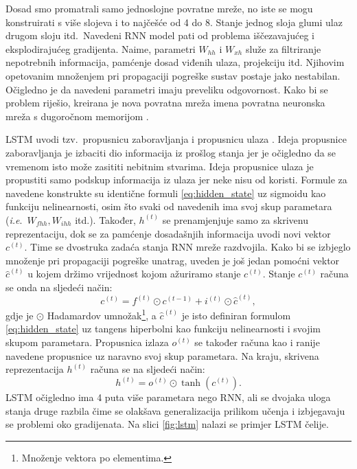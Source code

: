 \documentclass[times, utf8, diplomski]{fer}
\begin{document}
Dosad smo promatrali samo jednoslojne povratne mreže, no iste se mogu konstruirati s više slojeva i to najčešće od 4 do 8. Stanje jednog sloja glumi ulaz drugom sloju itd.\ Navedeni RNN model pati od problema iščezavajućeg i eksplodirajućeg gradijenta. Naime, parametri $W_{hh}$ i $W_{xh}$ služe za filtriranje nepotrebnih informacija, pamćenje dosad viđenih ulaza, projekciju itd. Njihovim opetovanim množenjem pri propagaciji pogreške sustav postaje jako nestabilan. Očigledno je da navedeni parametri imaju preveliku odgovornost. Kako bi se problem riješio, kreirana je nova povratna mreža imena povratna neuronska mreža s dugoročnom memorijom .

LSTM uvodi tzv.\ propusnicu zaboravljanja  i propusnicu ulaza . Ideja propusnice zaboravljanja je izbaciti dio informacija iz prošlog stanja jer je očigledno da se vremenom isto može zasititi nebitnim stvarima. Ideja propusnice ulaza je propustiti samo podskup informacija iz ulaza jer neke nisu od koristi. Formule za navedene konstrukte su identične formuli \ref{eq:hidden_state} uz sigmoidu kao funkciju nelinearnosti, osim što svaki od navedenih ima svoj skup parametara (\textit{i.e}.\ $W_{fhh}, W_{ihh}$ itd.). Također, $h^{(t)}$ se prenamjenjuje samo za skrivenu reprezentaciju, dok se za pamćenje dosadašnjih informacija uvodi novi vektor $c^{(t)}$. Time se dvostruka zadaća stanja RNN mreže razdvojila. Kako bi se izbjeglo množenje pri propagaciji pogreške unatrag, uveden je još jedan pomoćni vektor $\hat{c}^{(t)}$ u kojem držimo vrijednost kojom ažuriramo stanje $c^{(t)}$. Stanje $c^{(t)}$ računa se onda na sljedeći način:
\begin{equation}
    c^{(t)} = f^{(t)} \odot c^{(t-1)} + i^{(t)} \odot \hat{c}^{(t)},
\end{equation}
gdje je $\odot$ Hadamardov umnožak\footnote{Množenje vektora po elementima.}, a $\hat{c}^{(t)}$ je isto definiran formulom \ref{eq:hidden_state} uz tangens hiperbolni kao funkciju nelinearnosti i svojim skupom parametara. Propusnica izlaza  $o^{(t)}$ se također računa kao i ranije navedene propusnice uz naravno svoj skup parametara. Na kraju, skrivena reprezentacija
$h^{(t)}$ računa se na sljedeći način:
\begin{equation}
    h^{(t)} = o^{(t)} \odot \tanh(c^{(t)}).
\end{equation}
LSTM očigledno ima 4 puta više parametara nego RNN, ali se dvojaka uloga stanja druge razbila čime se olakšava generalizacija prilikom učenja i izbjegavaju se problemi oko gradijenata. Na slici \ref{fig:lstm} nalazi se primjer LSTM čelije.
\end{document}
